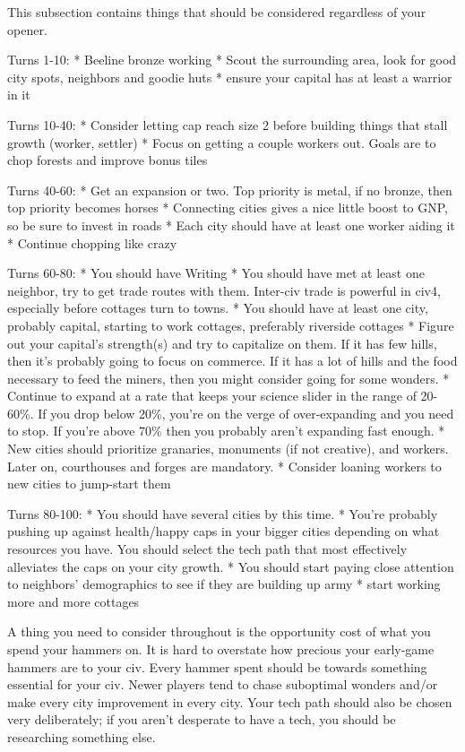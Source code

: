 \documentclass[10pt]{article}
\begin{document}
This subsection contains things that should be considered regardless of your opener.

Turns 1-10:
* Beeline bronze working
* Scout the surrounding area, look for good city spots, neighbors and goodie huts
* ensure your capital has at least a warrior in it

Turns 10-40:
* Consider letting cap reach size 2 before building things that stall growth (worker, settler)
* Focus on getting a couple workers out. Goals are to chop forests and improve bonus tiles

Turns 40-60:
* Get an expansion or two. Top priority is metal, if no bronze, then top priority becomes horses
* Connecting cities gives a nice little boost to GNP, so be sure to invest in roads
* Each city should have at least one worker aiding it
* Continue chopping like crazy

Turns 60-80:
* You should have Writing
* You should have met at least one neighbor, try to get trade routes with them. Inter-civ trade is powerful in civ4, especially
  before cottages turn to towns.
* You should have at least one city, probably capital, starting to work cottages, preferably riverside cottages
* Figure out your capital's strength(s) and try to capitalize on them. If it has few hills, then it's probably
  going to focus on commerce. If it has a lot of hills and the food necessary to feed the miners, then you might
  consider going for some wonders.
* Continue to expand at a rate that keeps your science slider in the range of 20-60\%. If you drop below 20\%,
  you're on the verge of over-expanding and you need to stop. If you're above 70\% then you probably aren't
  expanding fast enough.
* New cities should prioritize granaries, monuments (if not creative), and workers. Later on, courthouses and forges are mandatory.
* Consider loaning workers to new cities to jump-start them

Turns 80-100:
* You should have several cities by this time.
* You're probably pushing up against health/happy caps in your bigger cities depending on what
  resources you have. You should select the tech path that most effectively alleviates the caps
  on your city growth.
* You should start paying close attention to neighbors' demographics to see if they are building up army
* start working more and more cottages

A thing you need to consider throughout is the opportunity cost of what you spend your hammers on. It is
hard to overstate how precious your early-game hammers are to your civ. Every hammer spent should be
towards something essential for your civ. Newer players tend to chase suboptimal wonders and/or make every city
improvement in every city. Your tech path should also be chosen very deliberately; if you aren't desperate
to have a tech, you should be researching something else.
\end{document}
